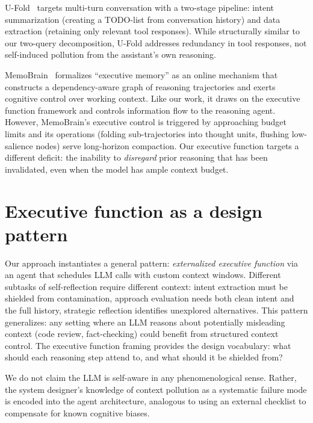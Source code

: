 \documentclass{article}
\begin{document}
U-Fold~\citep{ye2025ufold} targets multi-turn conversation with a two-stage pipeline: intent summarization (creating a TODO-list from conversation history) and data extraction (retaining only relevant tool responses). While structurally similar to our two-query decomposition, U-Fold addresses redundancy in tool responses, not self-induced pollution from the assistant's own reasoning.

MemoBrain~\citep{qian2026memobrain} formalizes ``executive memory'' as an online mechanism that constructs a dependency-aware graph of reasoning trajectories and exerts cognitive control over working context. Like our work, it draws on the executive function framework and controls information flow to the reasoning agent. However, MemoBrain's executive control is triggered by approaching budget limits and its operations (folding sub-trajectories into thought units, flushing low-salience nodes) serve long-horizon compaction. Our executive function targets a different deficit: the inability to \emph{disregard} prior reasoning that has been invalidated, even when the model has ample context budget.

\section{Executive function as a design pattern}
\label{app:exec-function-pattern}

Our approach instantiates a general pattern: \emph{externalized executive function} via an agent that schedules LLM calls with custom context windows. Different subtasks of self-reflection require different context: intent extraction must be shielded from contamination, approach evaluation needs both clean intent and the full history, strategic reflection identifies unexplored alternatives. This pattern generalizes: any setting where an LLM reasons about potentially misleading context (code review, fact-checking) could benefit from structured context control. The executive function framing provides the design vocabulary: what should each reasoning step attend to, and what should it be shielded from?

We do not claim the LLM is self-aware in any phenomenological sense. Rather, the system designer's knowledge of context pollution as a systematic failure mode is encoded into the agent architecture, analogous to using an external checklist to compensate for known cognitive biases.

%


\newpage

\end{document}
